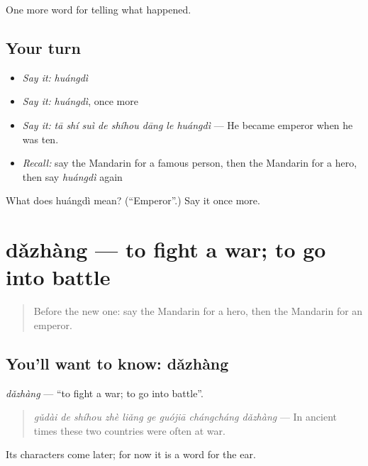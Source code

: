 \begin{grammarlens}[title={What you've built}]
One more word for telling what happened.
\end{grammarlens}

\subsection*{Your turn}
\begin{itemize}
\raggedright
  \item \emph{Say it:} \emph{huángdì}
  \item \emph{Say it:} \emph{huángdì}, once more
  \item \emph{Say it:} \emph{tā shí suì de shíhou dāng le huángdì} — He became emperor when he was ten.
  \item \emph{Recall:} say the Mandarin for a famous person, then the Mandarin for a hero, then say \emph{huángdì} again
\end{itemize}

\begin{tcolorbox}[breakable,colback=teal!4,colframe=teal!35!black,title={Before you move on}]
What does huángdì mean? (\textquotedblleft{}Emperor\textquotedblright{}.) Say it once more.
\end{tcolorbox}
\section[dǎzhàng]{dǎzhàng — to fight a war; to go into battle}

\label{lesson:ZH-C327-dazhang}



\begin{quote}
Before the new one: say the Mandarin for a hero, then the Mandarin for an emperor.
\end{quote}

\subsection*{You'll want to know: dǎzhàng}
\emph{dǎzhàng} — \textquotedblleft{}to fight a war; to go into battle\textquotedblright{}.

\begin{quote}
\emph{gǔdài de shíhou zhè liǎng ge guójiā chángcháng dǎzhàng} — In ancient times these two countries were often at war.
\end{quote}

Its characters come later; for now it is a word for the ear.

